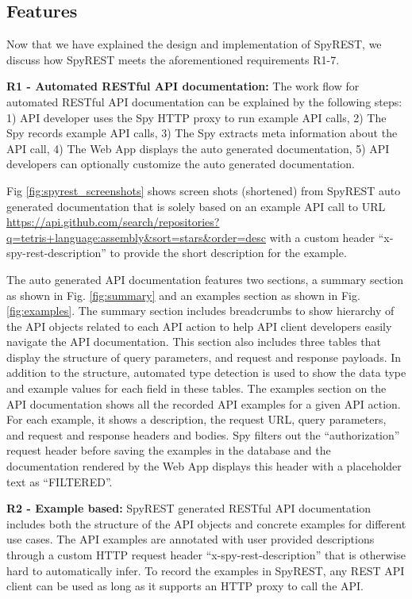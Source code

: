 \documentclass[conference]{IEEEtran}
\begin{document}
\subsection{Features} %

Now that we have explained the design and implementation of SpyREST, we discuss how SpyREST meets the aforementioned requirements R1-7.

\textbf{R1 - Automated RESTful API documentation:} The work flow for automated RESTful API documentation can be explained by the following steps: 1) API developer uses the Spy HTTP proxy to run example API calls, 2) The Spy records example API calls, 3) The Spy extracts meta information about the API call, 4) The Web App displays the auto generated documentation, 5) API developers can optionally customize the auto generated documentation.

Fig \ref{fig:spyrest_screenshots} shows screen shots (shortened) from SpyREST auto generated documentation that is solely based on an example API call to URL \url{https://api.github.com/search/repositories?q=tetris+language:assembly&sort=stars&order=desc} with a custom header ``x-spy-rest-description'' to provide the short description for the example.

The auto generated API documentation features two sections, a summary section as shown in Fig. \ref{fig:summary} and an examples section as shown in Fig. \ref{fig:examples}. The summary section includes breadcrumbs to show hierarchy of the API objects related to each API action to help API client developers easily navigate the API documentation. This section also includes three tables that display the structure of query parameters, and request and response payloads. In addition to the structure, automated type detection is used to show the data type and example values for each field in these tables. The examples section on the API documentation shows all the recorded API examples for a given API action. For each example, it shows a description, the request URL, query parameters, and request and response headers and bodies. Spy filters out the ``authorization'' request header before saving the examples in the database and the documentation rendered by the Web App displays this header with a placeholder text as ``FILTERED''.

\textbf{R2 - Example based:} SpyREST generated RESTful API documentation includes both the structure of the API objects and concrete examples for different use cases. The API examples are annotated with user provided descriptions through a custom HTTP request header ``x-spy-rest-description'' that is otherwise hard to automatically infer. To record the examples in SpyREST, any REST API client can be used as long as it supports an HTTP proxy to call the API.
\end{document}
